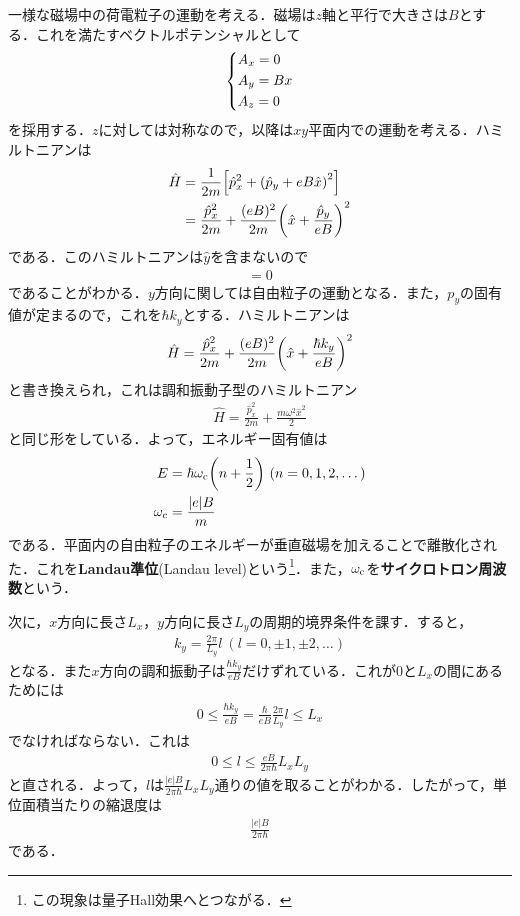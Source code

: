 \documentclass{report}
\begin{document}
  一様な磁場中の荷電粒子の運動を考える．磁場は$z$軸と平行で大きさは$B$とする．これを満たすベクトルポテンシャルとして
  \begin{align}
    \begin{dcases}
      A_x = 0\\
      A_y = Bx\\
      A_z = 0
    \end{dcases}
  \end{align}
  を採用する．$z$に対しては対称なので，以降は$xy$平面内での運動を考える．ハミルトニアンは
  \begin{align}
    \hat{H} &= \frac{1}{2m}\qty[\hat{p}_x^2 + \qty(\hat{p}_y + eB\hat{x})^2]\\
    &= \frac{\hat{p}_x^2}{2m} + \frac{(eB)^2}{2m}\qty(\hat{x} + \frac{\hat{p}_y}{eB})^2
  \end{align}
  である．このハミルトニアンは$\hat{y}$を含まないので
  \begin{align}
    [\hat{H}, \hat{p}_y] = 0
  \end{align}
  であることがわかる．$y$方向に関しては自由粒子の運動となる．また，$p_y$の固有値が定まるので，これを$\hbar k_y$とする．ハミルトニアンは
  \begin{align}
    \hat{H} = \frac{\hat{p}_x^2}{2m} + \frac{(eB)^2}{2m}\qty(\hat{x} + \frac{\hbar k_y}{eB})^2
  \end{align}
  と書き換えられ，これは調和振動子型のハミルトニアン
  \begin{align}
    \hat{H} = \frac{\hat{p}_x^2}{2m} + \frac{m\omega^2\hat{x}^2}{2}
  \end{align}
  と同じ形をしている．よって，エネルギー固有値は
  \begin{align}
    E &= \hbar\omega_{\mathrm{c}} \qty(n + \frac{1}{2})\ (n = 0,1,2,\dots)\\
    \omega_{\mathrm{c}} &= \frac{|e|B}{m}
  \end{align}
  である．平面内の自由粒子のエネルギーが垂直磁場を加えることで離散化された．これを\textbf{Landau準位}(Landau level)という\footnote{この現象は量子Hall効果へとつながる．}．また，$\omega_{\mathrm{c}}$を\textbf{サイクロトロン周波数}という．

  次に，$x$方向に長さ$L_x$，$y$方向に長さ$L_y$の周期的境界条件を課す．すると，
  \begin{align}
    k_y = \frac{2\pi}{L_y}l\ (l = 0,\pm 1, \pm2,\dots)
  \end{align}
  となる．また$x$方向の調和振動子は$\frac{\hbar k_y}{eB}$だけずれている．これが0と$L_x$の間にあるためには
  \begin{align}
    0 \leq \frac{\hbar k_y}{eB} = \frac{\hbar}{eB} \frac{2\pi}{L_y}l \leq L_x
  \end{align}
  でなければならない．これは
  \begin{align}
    0 \leq l \leq \frac{eB}{2\pi\hbar}L_xL_y
  \end{align}
  と直される．よって，$l$は$\frac{|e|B}{2\pi\hbar}L_xL_y$通りの値を取ることがわかる．したがって，単位面積当たりの縮退度は
  \begin{align}
    \frac{|e|B}{2\pi\hbar}
  \end{align}
  である．
\end{document}
